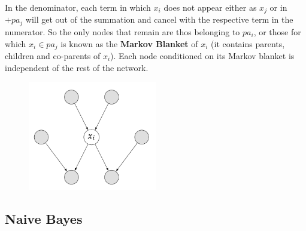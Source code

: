 In the denominator, each term in which $x_i$ does not appear either as $x_j$ or in $+pa_j$ will get out of the summation and cancel with the respective term in the numerator. So the only nodes that remain are thos belonging to $pa_i$, or those for which $x_i \in pa_j$ is known as the \textbf{Markov Blanket} of $x_i$ (it contains parents, children and co-parents of $x_i$). Each node conditioned on its Markov blanket is independent of the rest of the network. 

\begin{figure}[H]
    \centering
    \includegraphics[width=0.5\textwidth]{assets/fig17.png}
\end{figure}

\subsection{Naive Bayes}
\begin{center}
\end{center}